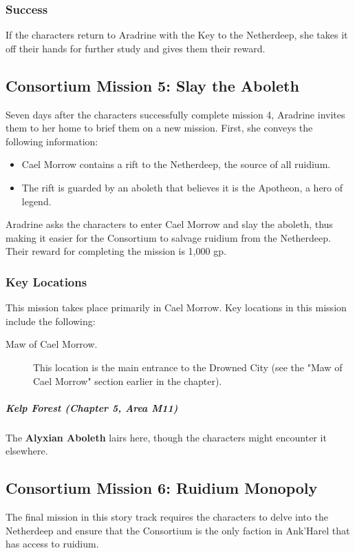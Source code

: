 \documentclass[10pt,a4paper,twoside,bg=print,twocolumn,openany,nodeprecatedcode]{dndbook}
\begin{document}
\subsubsection{Success}
If the characters return to Aradrine with the Key to the Netherdeep, she takes it off their hands for further study and gives them their reward.

\subsection{Consortium Mission 5: Slay the Aboleth}
Seven days after the characters successfully complete mission 4, Aradrine invites them to her home to brief them on a new mission. First, she conveys the following information:


\begin{itemize}
\item Cael Morrow contains a rift to the Netherdeep, the source of all ruidium.
\item The rift is guarded by an aboleth that believes it is the Apotheon, a hero of legend.
\end{itemize}

Aradrine asks the characters to enter Cael Morrow and slay the aboleth, thus making it easier for the Consortium to salvage ruidium from the Netherdeep. Their reward for completing the mission is 1,000 gp.

\subsubsection{Key Locations}
This mission takes place primarily in Cael Morrow. Key locations in this mission include the following:


\begin{description}
\item[Maw of Cael Morrow.]
This location is the main entrance to the Drowned City (see the "Maw of Cael Morrow" section earlier in the chapter).
\end{description}

\subparagraph{Kelp Forest (Chapter 5, Area M11)}
The \textbf{Alyxian Aboleth} lairs here, though the characters might encounter it elsewhere.

\subsection{Consortium Mission 6: Ruidium Monopoly}
The final mission in this story track requires the characters to delve into the Netherdeep and ensure that the Consortium is the only faction in Ank'Harel that has access to ruidium.
\end{document}
